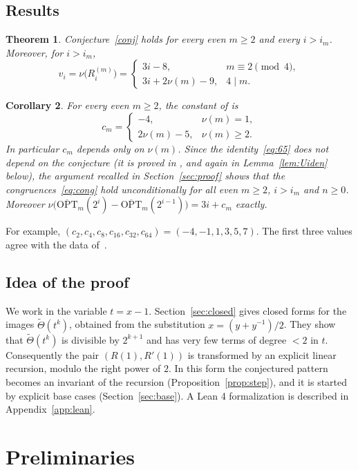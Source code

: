 \documentclass[11pt]{amsart}
\newtheorem{theorem}{Theorem}[section]
\newtheorem{corollary}[theorem]{Corollary}
\theoremstyle{definition}
\theoremstyle{remark}
\newcommand{\OPT}{\overline{\mathrm{OPT}}}
\newcommand{\Th}{\widetilde{\Theta}}
\begin{document}
\subsection*{Results}

\begin{theorem}\label{thm:main}
Conjecture~\ref{conj} holds for every even $m\ge2$ and every $i>i_m$. Moreover, for $i>i_m$,
\[
  v_i=\nu\big(R^{(m)}_i\big)=\begin{cases}3i-8,&m\equiv 2\pmod 4,\\[2pt] 3i+2\nu(m)-9,&4\mid m.\end{cases}
\]
\end{theorem}

\begin{corollary}\label{cor:cm}
For every even $m\ge2$, the constant of \cite[Corollary~6.3]{ST} is
\[
  c_m=\begin{cases}-4,&\nu(m)=1,\\ 2\nu(m)-5,&\nu(m)\ge2.\end{cases}
\]
In particular $c_m$ depends only on $\nu(m)$. Since the identity~\eqref{eq:65} does not depend on the conjecture (it is proved in \cite[\S6]{ST}, and again in Lemma~\ref{lem:Uiden} below), the argument recalled in Section~\ref{sec:proof} shows that the congruences~\eqref{eq:cong} hold unconditionally for all even $m\ge2$, $i>i_m$ and $n\ge0$. Moreover $\nu\big(\OPT_m(2^i)-\OPT_m(2^{i-1})\big)=3i+c_m$ exactly.
\end{corollary}

For example, $(c_2,c_4,c_8,c_{16},c_{32},c_{64})=(-4,-1,1,3,5,7)$. The first three values agree with the data of~\cite{ST}.

\subsection*{Idea of the proof}
We work in the variable $t=x-1$. Section~\ref{sec:closed} gives closed forms for the images $\Th(t^k)$, obtained from the substitution $x=(y+y^{-1})/2$. They show that $\Th(t^k)$ is divisible by $2^{k+1}$ and has very few terms of degree $<2$ in $t$. Consequently the pair $(R(1),R'(1))$ is transformed by an explicit linear recursion, modulo the right power of $2$. In this form the conjectured pattern becomes an invariant of the recursion (Proposition~\ref{prop:step}), and it is started by explicit base cases (Section~\ref{sec:base}). A Lean 4 formalization is described in Appendix~\ref{app:lean}.

\section{Preliminaries}\label{sec:prelim}
\end{document}
